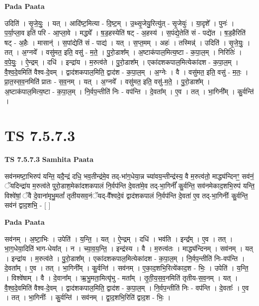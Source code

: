 \documentclass[17pt]{extarticle}
\begin{document}
\textbf{Pada Paata} \newline

उदिति॑ । सृ॒जे॒युः॒ । यत् । आदि॑ष्ट॒मित्या - दि॒ष्ट॒म् । उ॒थ्सृ॒जेयु॒रित्यु॑त् - सृ॒जेयुः॑ । या॒दृशे᳚ । पुनः॑ । प॒र्या॒प्ला॒व इति॑ परि - आ॒प्ला॒वे । मद्ध्ये᳚ । ष॒ड॒हस्येति॑ षट् - अ॒हस्य॑ । स॒पंद्ये॒तेति॑ सं - पद्ये॑त । ष॒ड॒हैरिति॑ षट् - अ॒हैः । मासान्॑ । स॒पांद्येति॑ सं - पाद्य॑ । यत् । स॒प्त॒मम् । अहः॑ । तस्मिन्न्॑ । उदिति॑ । सृ॒जे॒युः॒ । तत् । अ॒ग्नये᳚ । वसु॑मत॒ इति॒ वसु॑ - म॒ते॒ । पु॒रो॒डाश᳚म् । अ॒ष्टाक॑पाल॒मित्य॒ष्टा - क॒पा॒ल॒म् । निरितिः॑ । व॒पे॒युः॒ । ऐ॒न्द्रम् । दधि॑ । इन्द्रा॑य । म॒रुत्व॑ते । पु॒रो॒डाश᳚म् । एका॑दशकपाल॒मित्येका॑दश - क॒पा॒ल॒म् । वै॒श्व॒दे॒वमिति॑ वैश्व-दे॒वम् । द्वाद॑शकपाल॒मिति॒ द्वाद॑श - क॒पा॒ल॒म् । अ॒ग्नेः । वै । वसु॑मत॒ इति॒ वसु॑ - म॒तः॒ । प्रा॒त॒स्स॒व॒नमिति॑ प्रातः - स॒व॒नम् । यत् । अ॒ग्नये᳚ । वसु॑मत॒ इति॒ वसु॑-म॒ते॒ । पु॒रो॒डाश᳚म् । अ॒ष्टाक॑पाल॒मित्य॒ष्टा - क॒पा॒ल॒म् । नि॒र्वप॒न्तीति॑ निः - वप॑न्ति । दे॒वता᳚म् । ए॒व । तत् । भा॒गिनी᳚म् । कु॒र्वन्ति॑ ।  \newline




\section*{ TS 7.5.7.3 }

\textbf{TS 7.5.7.3 } \newline
\textbf{Samhita Paata} \newline

सव॑नमष्टा॒भिरुप॑ यन्ति॒ यदै॒न्द्रं दधि॒ भव॒तीन्द्र॑मे॒व तद्-भा॑ग॒धेया॒न्न च्या॑वय॒न्तीन्द्र॑स्य॒ वै म॒रुत्व॑तो॒ माद्ध्य॑न्दिनꣳ॒॒ सव॑नं॒ ॅयदिन्द्रा॑य म॒रुत्व॑ते पुरो॒डाश॒मेका॑दशकपालं नि॒र्वप॑न्ति दे॒वता॑मे॒व तद्-भा॒गिनीं᳚ कु॒र्वन्ति॒ सव॑नमेकाद॒शभि॒रुप॑ यन्ति॒ विश्वे॑षां॒ ॅवै दे॒वाना॑मृभु॒मतां᳚ तृतीयसव॒नंॅयद्-वै᳚श्वदे॒वं द्वाद॑शकपालं नि॒र्वप॑न्ति दे॒वता॑ ए॒व तद्-भा॒गिनीः᳚ कु॒र्वन्ति॒ सव॑नं द्वाद॒शभि॒ - [  ] \newline

\textbf{Pada Paata} \newline

सव॑नम् । अ॒ष्टा॒भिः । उपेति॑ । य॒न्ति॒ । यत् । ऐ॒न्द्रम् । दधि॑ । भव॑ति । इन्द्र᳚म् । ए॒व । तत् । भा॒ग॒धेया॒दिति॑ भाग-धेया᳚त् । न । च्या॒व॒य॒न्ति॒ । इन्द्र॑स्य । वै । म॒रुत्व॑तः । माद्ध्य॑न्दिनम् । सव॑नम् । यत् । इन्द्रा॑य । म॒रुत्व॑ते । पु॒रो॒डाश᳚म् । एका॑दशकपाल॒मित्येका॑दश - क॒पा॒ल॒म् । नि॒र्वप॒न्तीति॑ निः-वप॑न्ति । दे॒वता᳚म् । ए॒व । तत् । भा॒गिनी᳚म् । कु॒र्वन्ति॑ । सव॑नम् । ए॒का॒द॒शभि॒रित्ये॑काद॒श - भिः॒ । उपेति॑ । य॒न्ति॒ । विश्वे॑षाम् । वै । दे॒वाना᳚म् । ऋ॒भु॒मता॒मित्यृ॑भु - मता᳚म् । तृ॒ती॒य॒स॒व॒नमिति॑ तृतीय-स॒व॒नम् । यत् । वै॒श्व॒दे॒वमिति॑ वैश्व-दे॒वम् । द्वाद॑शकपाल॒मिति॒ द्वाद॑श - क॒पा॒ल॒म् । नि॒र्वप॒न्तीति॑ निः - वप॑न्ति । दे॒वताः᳚ । ए॒व । तत् । भा॒गिनीः᳚ । कु॒र्वन्ति॑ । सव॑नम् । द्वा॒द॒शभि॒रिति॑ द्वाद॒श - भिः॒ ।  \newline
\end{document}
